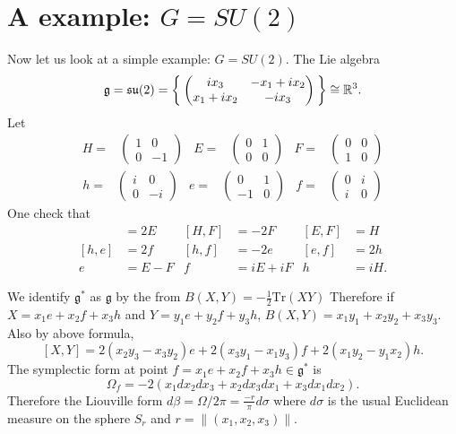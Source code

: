 \documentclass[11pt]{amsart}
\def\bR{{\mathbb{R}}}
\def\fgg{{\mathfrak{g}}}
\def\Tr{\mathrm{Tr}}
\begin{document}
\section{A example: $G = SU(2)$}
Now let us look at a simple example: $G=SU(2)$.
The Lie algebra 
\[
\fgg  = \mathfrak{su}(2) = 
\Set{\begin{pmatrix}
ix_3 & -x_1+ix_2\\
x_1+ix_2& -ix_3
\end{pmatrix}
}\cong \bR^3.
\] 
Let
\begin{align*}
H =& \begin{pmatrix}
1 & 0\\
0 & -1
\end{pmatrix} &
E =& \begin{pmatrix}
0 & 1\\
0 & 0
\end{pmatrix} &
F =& \begin{pmatrix}
0 & 0\\
1 & 0
\end{pmatrix}
\end{align*}
\begin{align*}
h =& \begin{pmatrix}
i & 0\\
0 & -i
\end{pmatrix} &
e =& \begin{pmatrix}
0 & 1\\
-1 & 0
\end{pmatrix} &
f =& \begin{pmatrix}
0 & i\\
i & 0
\end{pmatrix}
\end{align*}
One check that 
\begin{align*}
[H,E] &= 2E& [H,F] &= -2F& [E,F] &= H\\ 
[h,e] &= 2 f & [h,f] &= -2e &[e,f] &= 2h\\
e &= E -F& f &= iE+iF & h& = iH.
\end{align*}

We identify $\fgg^*$ as $\fgg$ by the from 
$B(X,Y) = -\frac{1}{2}\Tr(XY)$ 
Therefore if $X = x_1e+x_2f+x_3h$ and $Y = y_1e+y_2f+y_3h$, 
$B(X,Y) = x_1y_1+x_2y_2+x_3y_3$.
Also by above formula, 
\[
[X,Y] = 2(x_2y_3-x_3y_2)e+2(x_3y_1- x_1y_3)f +2(x_1y_2-y_1x_2) h.
\]
The symplectic form at point $f = x_1 e+ x_2 f+ x_3 h \in \fgg^*$ is 
\[
\Omega_f = - 2(x_1 dx_2dx_3 + x_2dx_3 dx_1+ x_3 dx_1 dx_2).
\] 
Therefore the Liouville form $d\beta = \Omega/2\pi=\frac{-r}{\pi}d\sigma$
where $d\sigma$ is the usual Euclidean measure on the sphere $S_r$ and
$r = \|(x_1,x_2,x_3)\|$. 
\end{document}
